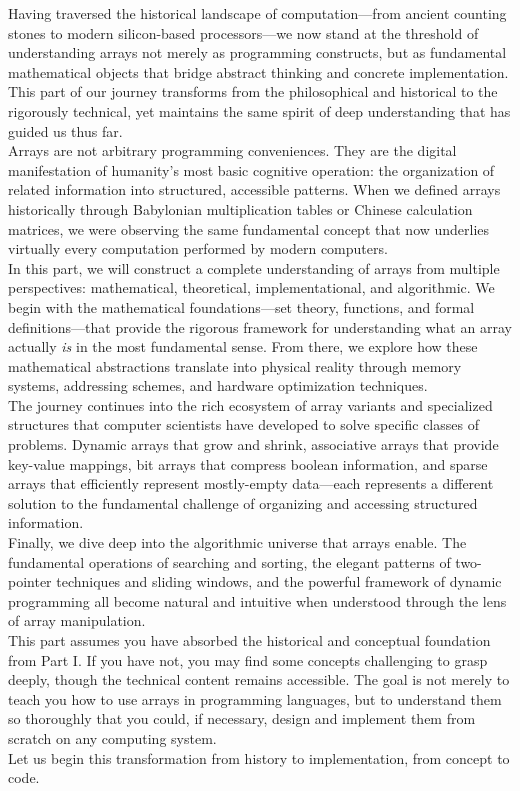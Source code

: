 \documentclass[12pt, oneside]{book}
\begin{document}
Having traversed the historical landscape of computation—from ancient counting stones to modern silicon-based processors—we now stand at the threshold of understanding arrays not merely as programming constructs, but as fundamental mathematical objects that bridge abstract thinking and concrete implementation. This part of our journey transforms from the philosophical and historical to the rigorously technical, yet maintains the same spirit of deep understanding that has guided us thus far.\\
Arrays are not arbitrary programming conveniences. They are the digital manifestation of humanity's most basic cognitive operation: the organization of related information into structured, accessible patterns. When we defined arrays historically through Babylonian multiplication tables or Chinese calculation matrices, we were observing the same fundamental concept that now underlies virtually every computation performed by modern computers.\\
In this part, we will construct a complete understanding of arrays from multiple perspectives: mathematical, theoretical, implementational, and algorithmic. We begin with the mathematical foundations—set theory, functions, and formal definitions—that provide the rigorous framework for understanding what an array actually \emph{is} in the most fundamental sense. From there, we explore how these mathematical abstractions translate into physical reality through memory systems, addressing schemes, and hardware optimization techniques.\\
The journey continues into the rich ecosystem of array variants and specialized structures that computer scientists have developed to solve specific classes of problems. Dynamic arrays that grow and shrink, associative arrays that provide key-value mappings, bit arrays that compress boolean information, and sparse arrays that efficiently represent mostly-empty data—each represents a different solution to the fundamental challenge of organizing and accessing structured information.\\
Finally, we dive deep into the algorithmic universe that arrays enable. The fundamental operations of searching and sorting, the elegant patterns of two-pointer techniques and sliding windows, and the powerful framework of dynamic programming all become natural and intuitive when understood through the lens of array manipulation.\\
This part assumes you have absorbed the historical and conceptual foundation from Part I. If you have not, you may find some concepts challenging to grasp deeply, though the technical content remains accessible. The goal is not merely to teach you how to use arrays in programming languages, but to understand them so thoroughly that you could, if necessary, design and implement them from scratch on any computing system.\\
Let us begin this transformation from history to implementation, from concept to code.
\end{document}
